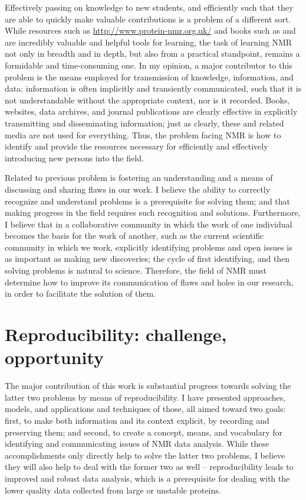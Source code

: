 Effectively passing on knowledge to new students, and efficiently such that
they are able to quickly make valuable contributions is a problem of a different
sort.  While resources such as \url{http://www.protein-nmr.org.uk/} and books
such as \cite{hoch1996nmr} and \cite{keeler2013} are incredibly valuable and
helpful tools for learning, the task of learning NMR not only in breadth and
in depth, but also from a practical standpoint, remains a formidable and
time-consuming one.  In my opinion, a major contributor to this problem is 
the means employed for transmission of knowledge, information, and data:
information is often implicitly and transiently communicated, such that it is
not understandable without the appropriate context, nor is it recorded.
Books, websites, data archives, and journal publications are clearly effective
in explicitly transmitting and disseminating information; just as clearly,
these and related media are not used for everything.  Thus, the problem facing
NMR is how to identify and provide the resources necessary for efficiently and
effectively introducing new persons into the field. 

Related to previous problem is fostering an understanding and a means of 
discussing and sharing flaws in our work.  I believe the ability to correctly
recognize and understand problems is a prerequisite for solving them; and that
making progress in the field requires such recognition and solutions.  
Furthermore, I believe that in a collaborative community in which the work of
one individual becomes the basis for the work of another, such as the current
scientific community in which we work, explicitly identifying problems and
open issues is as important as making new discoveries; the cycle of first
identifying, and then solving problems is natural to science.  Therefore, 
the field of NMR must determine how to improve its communication of flaws 
and holes in our research, in order to facilitate the solution of them.


\section{Reproducibility: challenge, opportunity}
The major contribution of this work is substantial progress towards solving
the latter two problems by means of reproducibility.  I have presented 
approaches, models, and applications and techniques of those, all aimed toward
two goals: first, to make both information and its context explicit, by recording
and preserving them; and second, to create a concept, means, and vocabulary for
identifying and communicating issues of NMR data analysis.  While these 
accomplishments only directly help to solve the latter two problems, I believe
they will also help to deal with the former two as well -- reproducibility
leads to improved and robust data analysis, which is a prerequisite for dealing
with the lower quality data collected from large or unstable proteins.


